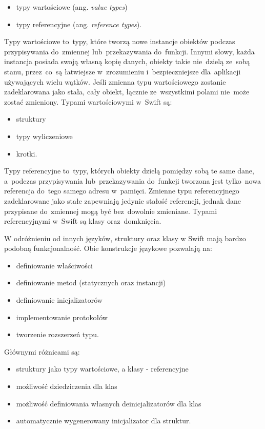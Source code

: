 \documentclass[mgr, shortabstract]{iithesis}
\newcommand{\ang}[1]{ang. \textit{#1}}
\begin{document}
\begin{itemize}
    \item typy wartościowe (\ang{value types})
    \item typy referencyjne (\ang{reference types}).
\end{itemize}

Typy wartościowe to~typy, które tworzą nowe instancje obiektów podczas przypisywania do~zmiennej lub~przekazywania do~funkcji. Innymi słowy, każda instancja posiada swoją własną kopię danych, obiekty takie nie~dzielą ze~sobą stanu, przez~co~są łatwiejsze w~zrozumieniu i~bezpieczniejsze dla~aplikacji używających wielu wątków. Jeśli zmienna typu wartościowego zostanie zadeklarowana jako stała, cały obiekt, łącznie ze~wszystkimi polami nie~może zostać zmieniony. Typami wartościowymi w~Swift są:

\begin{itemize}
    \item struktury
    \item typy wyliczeniowe
    \item krotki.
\end{itemize}

Typy referencyjne to~typy, których obiekty dzielą pomiędzy sobą te same dane, a~podczas przypisywania lub~przekazywania do~funkcji tworzona jest tylko~nowa referencja do~tego samego adresu w~pamięci. Zmienne typu referencyjnego zadeklarowane jako stałe zapewniają jedynie stałość referencji, jednak dane przypisane do~zmiennej mogą być bez~dowolnie zmieniane. Typami referencyjnymi w~Swift są klasy oraz~domknięcia.

W odróżnieniu od innych języków, struktury oraz klasy w Swift mają bardzo podobną funkcjonalność. Obie konstrukcje językowe pozwalają na:

\begin{itemize}
    \item definiowanie właściwości
    \item definiowanie metod (statycznych oraz instancji)
    \item definiowanie inicjalizatorów
    \item implementowanie protokołów
    \item tworzenie rozszerzeń typu.
\end{itemize}

Głównymi różnicami są:

\begin{itemize}
    \item struktury jako typy wartościowe, a klasy - referencyjne
    \item możliwość dziedziczenia dla klas
    \item możliwość definiowania własnych deinicjalizatorów dla klas
    \item automatycznie wygenerowany inicjalizator dla struktur.
\end{itemize}
\end{document}
